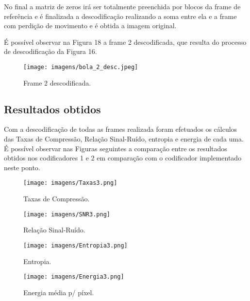 \documentclass[12pt,a4paper]{article}
\begin{document}
No final a matriz de zeros irá ser totalmente preenchida por blocos da frame de referência e é finalizada a descodificação realizando a soma entre ela e a frame com perdição de movimento e é obtida a imagem original.

É possível observar na Figura 18 a frame 2 descodificada, que resulta do processo de descodificação da Figura 16.

\begin{figure}[h]
\texttt{[image: imagens/bola\_2\_desc.jpeg]}
\centering
\caption{Frame 2 descodificada.}
\end{figure}

\newpage

\subsection{Resultados obtidos}
Com a descodificação de todas as frames realizada foram efetuados os cálculos das Taxas de Compressão, Relação Sinal-Ruído, entropia e energia de cada uma. É possível observar nas Figuras seguintes a comparação entre os resultados obtidos nos codificadores 1 e 2 em comparação com o codificador implementado neste ponto.

\begin{figure}[h]
	\centering
    \begin{minipage}{0.45\textwidth}
        \centering
        \texttt{[image: imagens/Taxas3.png]}
        \caption{Taxas de Compressão.}
    \end{minipage}\hfill
    \begin{minipage}{0.45\textwidth}
        \centering
        \texttt{[image: imagens/SNR3.png]}
        \caption{Relação Sinal-Ruído.}
    \end{minipage}
\end{figure}
\begin{figure}[h]
	\centering
    \begin{minipage}{0.45\textwidth}
        \centering
        \texttt{[image: imagens/Entropia3.png]}
        \caption{Entropia.}
    \end{minipage}\hfill
    \begin{minipage}{0.45\textwidth}
        \centering
        \texttt{[image: imagens/Energia3.png]}
        \caption{Energia média p/ píxel.}
    \end{minipage}
\end{figure}
\end{document}
